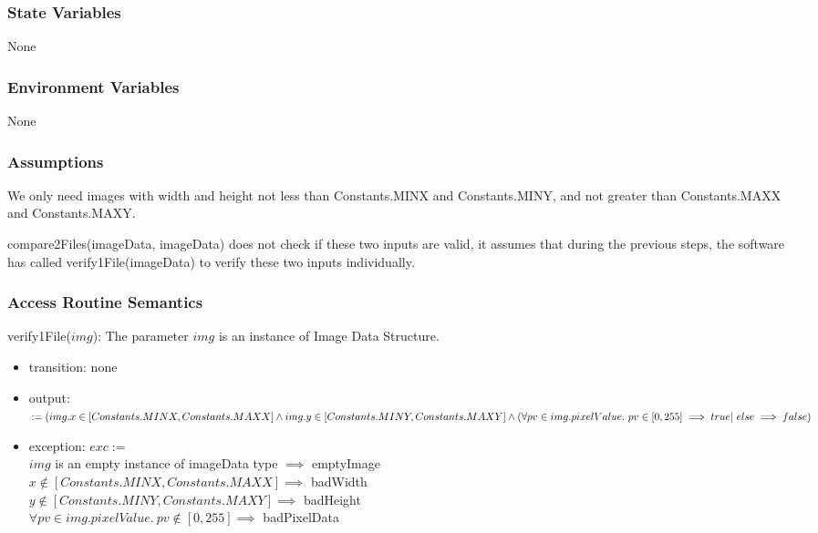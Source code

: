 \documentclass[12pt, titlepage]{article}
\begin{document}
\subsubsection{State Variables}

None

\subsubsection{Environment Variables}

None

\subsubsection{Assumptions}

We only need images with width and height not less than Constants.MINX and
Constants.MINY, and not greater than Constants.MAXX and Constants.MAXY.

compare2Files(imageData, imageData) does not check if these two inputs are
valid, it assumes that during the previous steps, the software has called
verify1File(imageData) to verify these two inputs individually.

\subsubsection{Access Routine Semantics}

\noindent verify1File($img$):
The parameter $img$ is an instance of Image Data Structure.
\begin{itemize}
\item transition: none
\item output: $:= (img.x \in [Constants.MINX,Constants.MAXX] \land img.y \in
[Constants.MINY,\\
Constants.MAXY] \land
(\forall pv \in img.pixelValue.\ pv \in [0,255] \implies true |\ else \implies
false)$
\item exception: $exc :=$\\
$img$ is an empty instance of imageData type $\implies$ emptyImage\\
$x \not\in [Constants.MINX,Constants.MAXX] \implies$ badWidth\\
$y \not\in [Constants.MINY,Constants.MAXY] \implies$ badHeight\\
$\forall pv \in img.pixelValue.\ pv \not\in [0,255] \implies$ badPixelData
\end{itemize}
\end{document}
